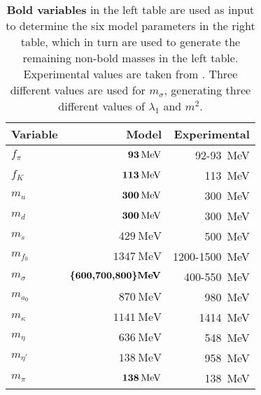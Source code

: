 \begin{table}
\centering
\caption{\label{tab:lsm3f:parameters}%
\textbf{Bold variables} in the left table are used as input to determine the six model parameters in the right table,
which in turn are used to generate the remaining non-bold masses in the left table.
Experimental values are taken from \cite{ref:pdg_review_2021}.
Three different values are used for $m_\sigma$,
generating three different values of $\lambda_1$ and $m^2$.
}
\begin{tabular}{ l r r }
	\toprule
	Variable          & Model                                   & Experimental                            \\
	\midrule
	$f_\pi$           & $\textbf{\SI{93}{\mega\electronvolt}}$  & \SI{92}{}-\SI{93}{\mega\electronvolt}            \\
	$f_K$             & $\textbf{\SI{113}{\mega\electronvolt}}$ & \SI{113}{\mega\electronvolt}                     \\
	\midrule
	$m_u$             & $\textbf{\SI{300}{\mega\electronvolt}}$ & \approx \, \SI{300}{\mega\electronvolt}          \\
	$m_d$             & $\textbf{\SI{300}{\mega\electronvolt}}$ & \approx \, \SI{300}{\mega\electronvolt}          \\
	$m_s$             & $\SI{429}{\mega\electronvolt}$          & \approx \, \SI{500}{\mega\electronvolt}          \\
	\midrule
	$m_{f_0}$         & $\SI{1347}{\mega\electronvolt}$         & \SI{1200}{}-\SI{1500}{\mega\electronvolt}        \\
	$m_\sigma$        & $\textbf{\{600,700,800\}\si{\mega\electronvolt}}$ & \SI{400}{}-\SI{550}{\mega\electronvolt}          \\
	$m_{a_0}$         & $\SI{870}{\mega\electronvolt}$          & \SI{980}{\mega\electronvolt}                     \\
	$m_\kappa$        & $\SI{1141}{\mega\electronvolt}$         & \SI{1414}{\mega\electronvolt}                    \\
	$m_\eta$          & $\SI{636}{\mega\electronvolt}$          & \SI{548}{\mega\electronvolt}                     \\
	$m_{\eta'}$       & $\SI{138}{\mega\electronvolt}$          & \SI{958}{\mega\electronvolt}                     \\
	$m_\pi$           & $\textbf{\SI{138}{\mega\electronvolt}}$ & \SI{138}{\mega\electronvolt}                     \\

\end{tabular}
\end{table}
